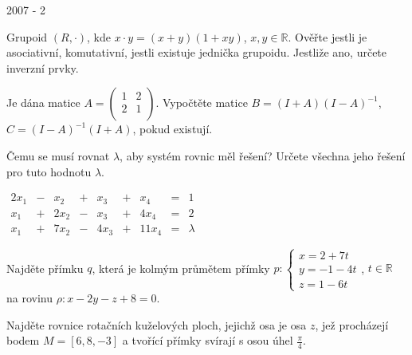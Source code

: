 \newpage
{\large 2007 - 2}

\begin{questions}

\question Grupoid \((R, \cdot)\), kde \(x \cdot y = (x+y)(1+xy)\), \(x, y \in \mathbb{R}\). Ověřte jestli je asociativní, komutativní, jestli existuje jednička grupoidu. Jestliže ano, určete inverzní prvky.

\question Je dána matice \(A = \begin{pmatrix}
    1 & 2\\
    2 & 1\\
\end{pmatrix}\). Vypočtěte matice \(B = (I+A)(I-A)^{-1}\), \(C = (I-A)^{-1}(I+A)\), pokud existují.

\newpage

\question Čemu se musí rovnat \(\lambda\), aby systém rovnic měl řešení? Určete všechna jeho řešení pro tuto hodnotu \(\lambda\). \begin{center}
    \(\begin{matrix}
        2x_1 & - &  x_2 & + &  x_3 & + &   x_4 & = & 1 \\
         x_1 & + & 2x_2 & - &  x_3 & + &  4x_4 & = & 2 \\
         x_1 & + & 7x_2 & - & 4x_3 & + & 11x_4 & = & \lambda
    \end{matrix}\)
\end{center}

\question Najděte přímku \(q\), která je kolmým průmětem přímky \(p: \left\{
    \begin{array}{l}
        x = 2 + 7t \\
        y = -1 - 4t \\
        z = 1 - 6t
    \end{array}
\right.\), \(t \in \mathbb{R}\) na rovinu \(\rho:  x - 2y - z + 8 = 0\).

\newpage
\question Najděte rovnice rotačních kuželových ploch, jejichž osa je osa \(z\), jež procházejí bodem \(M = [6,8,-3]\) a tvořící přímky svírají s osou úhel \(\frac{\pi}{4}\).

\end{questions}
